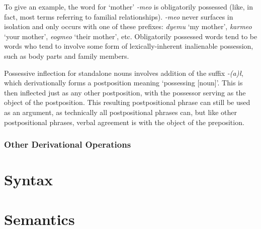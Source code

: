 \documentclass[a4paper,11pt,oneside,openany]{memoir}
\begin{document}
To give an example, the \lang{} word for `mother' \textit{-meo} is obligatorily possessed (like, in fact, most terms referring to familial relationships). \textit{-meo} never surfaces in isolation and only occurs with one of these prefixes: \textit{dyemu} `my mother', \textit{karmeo} `your mother', \textit{eogmeo} `their mother', etc. Obligatorily possessed words tend to be words who tend to involve some form of lexically-inherent inalienable possession, such as body parts and family members.

Possessive inflection for standalone nouns involves addition of the suffix \textit{-(a)\l}, which derivationally forms a postposition meaning `possessing [noun]'. This is then inflected just as any other postposition, with the possessor serving as the object of the postposition. This resulting postpositional phrase can still be used as an argument, as technically all postpositional phrases can, but like other postpositional phrases, verbal agreement is with the object of the preposition. 

\subsection{Other Derivational Operations}

\chapter{Syntax}

\chapter{Semantics}


\end{document}
